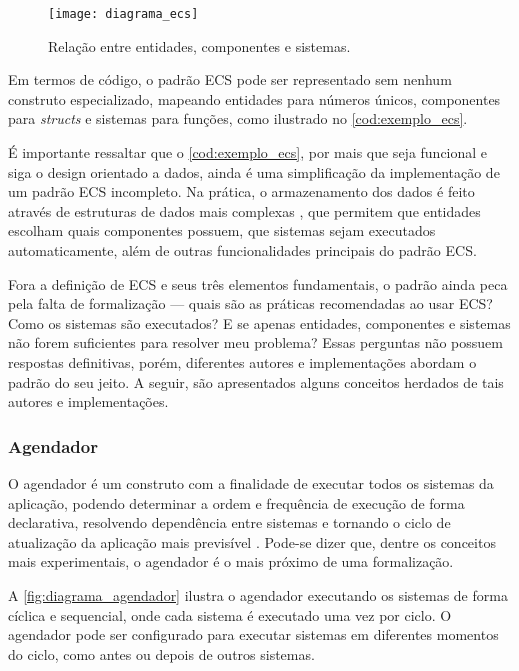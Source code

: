 \begin{figure}[H]
	\centering
	\texttt{[image: diagrama\_ecs]}
	\caption{Relação entre entidades, componentes e sistemas.}
	\label{fig:diagrama_ecs}
\end{figure}

Em termos de código, o padrão ECS pode ser representado sem nenhum construto especializado, mapeando entidades para números únicos, componentes para \textit{structs} e sistemas para funções, como ilustrado no \autoref{cod:exemplo_ecs}.

\codigoRust


É importante ressaltar que o \autoref{cod:exemplo_ecs}, por mais que seja funcional e siga o design orientado a dados, ainda é uma simplificação da implementação de um padrão ECS incompleto. Na prática, o armazenamento dos dados é feito através de estruturas de dados mais complexas \cite{ecsstorageinpics}, que permitem que entidades escolham quais componentes possuem, que sistemas sejam executados automaticamente, além de outras funcionalidades principais do padrão ECS.

Fora a definição de ECS e seus três elementos fundamentais, o padrão ainda peca pela falta de formalização — quais são as práticas recomendadas ao usar ECS? Como os sistemas são executados? E se apenas entidades, componentes e sistemas não forem suficientes para resolver meu problema? Essas perguntas não possuem respostas definitivas, porém, diferentes autores e implementações abordam o padrão do seu jeito. A seguir, são apresentados alguns conceitos herdados de tais autores e implementações.

\subsubsection{Agendador}

O agendador é um construto com a finalidade de executar todos os sistemas da aplicação, podendo determinar a ordem e frequência de execução de forma declarativa, resolvendo dependência entre sistemas e tornando o ciclo de atualização da aplicação mais previsível \cite{bevy}. Pode-se dizer que, dentre os conceitos mais experimentais, o agendador é o mais próximo de uma formalização.

A \autoref{fig:diagrama_agendador} ilustra o agendador executando os sistemas de forma cíclica e sequencial, onde cada sistema é executado uma vez por ciclo. O agendador pode ser configurado para executar sistemas em diferentes momentos do ciclo, como antes ou depois de outros sistemas.

